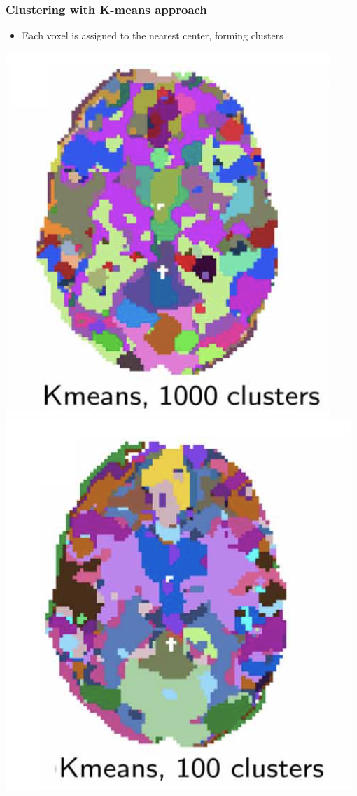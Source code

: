 \documentclass{beamer}
\begin{document}
\begin{frame}
\frametitle{Clustering with K-means approach}
\begin{itemize}
\item Each voxel is assigned to the nearest center, forming clusters
\end{itemize}
\centering
\includegraphics[scale=0.5]{K-means1.png}
\includegraphics[scale=0.5]{K-means2.png}
\end{frame}
\end{document}
